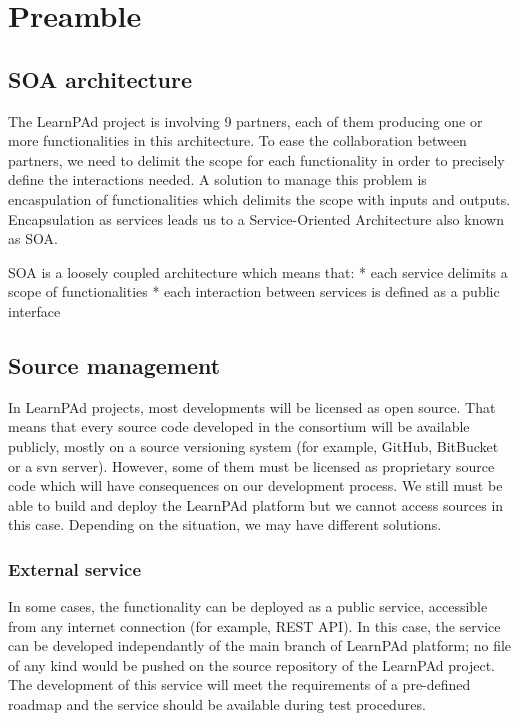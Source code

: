 \chapter{Preamble}
\label{ch:preamble}

\section{SOA architecture}
\label{sec:soa-architecture}

The LearnPAd project is involving 9 partners, each of them producing one or more functionalities in this architecture.  To ease the collaboration between partners, we need to delimit the scope for each functionality in order to precisely define the interactions needed.  A solution to manage this problem is encaspulation of functionalities which delimits the scope with inputs and outputs.  Encapsulation as services leads us to a Service-Oriented Architecture also known as SOA.

SOA is a loosely coupled architecture which means that:
* each service delimits a scope of functionalities
* each interaction between services is defined as a public interface

\section{Source management}
\label{sec:source-management}

In LearnPAd projects, most developments will be licensed as open source.  That means that every source code developed in the consortium will be available publicly, mostly on a source versioning system (for example, GitHub, BitBucket or a svn server).
However, some of them must be licensed as proprietary source code which will have consequences on our development process.  We still must be able to build and deploy the LearnPAd platform but we cannot access sources in this case.  Depending on the situation, we may have different solutions.

\subsection{External service}
\label{sec:external-service}

In some cases, the functionality can be deployed as a public service, accessible from any internet connection (for example, REST API).  In this case, the service can be developed independantly of the main branch of LearnPAd platform; no file of any kind would be pushed on the source repository of the LearnPAd project.  The development of this service will meet the requirements of a pre-defined roadmap and the service should be available during test procedures.


